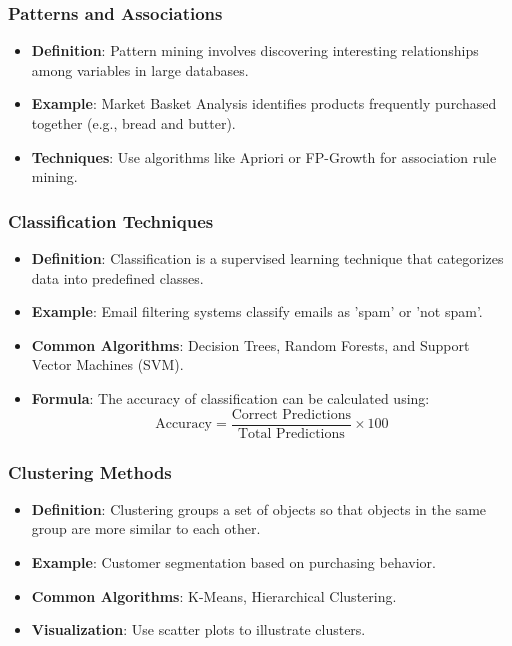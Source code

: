\documentclass[aspectratio=169]{beamer}
\begin{document}
\begin{frame}[fragile]
    \frametitle{Patterns and Associations}
    \begin{itemize}
        \item \textbf{Definition}: Pattern mining involves discovering interesting relationships among variables in large databases.
        \item \textbf{Example}: Market Basket Analysis identifies products frequently purchased together (e.g., bread and butter).
        \item \textbf{Techniques}: Use algorithms like Apriori or FP-Growth for association rule mining.
    \end{itemize}
\end{frame}

\begin{frame}[fragile]
    \frametitle{Classification Techniques}
    \begin{itemize}
        \item \textbf{Definition}: Classification is a supervised learning technique that categorizes data into predefined classes.
        \item \textbf{Example}: Email filtering systems classify emails as 'spam' or 'not spam'.
        \item \textbf{Common Algorithms}: Decision Trees, Random Forests, and Support Vector Machines (SVM).
        \item \textbf{Formula}: The accuracy of classification can be calculated using:
            \begin{equation}
            \text{Accuracy} = \frac{\text{Correct Predictions}}{\text{Total Predictions}} \times 100
            \end{equation}
    \end{itemize}
\end{frame}

\begin{frame}[fragile]
    \frametitle{Clustering Methods}
    \begin{itemize}
        \item \textbf{Definition}: Clustering groups a set of objects so that objects in the same group are more similar to each other.
        \item \textbf{Example}: Customer segmentation based on purchasing behavior.
        \item \textbf{Common Algorithms}: K-Means, Hierarchical Clustering.
        \item \textbf{Visualization}: Use scatter plots to illustrate clusters.
    \end{itemize}
\end{frame}
\end{document}
